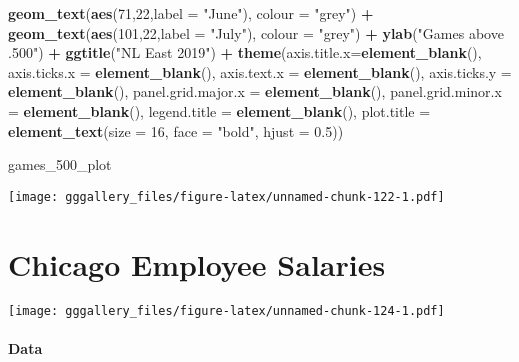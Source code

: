 \documentclass[]{book}
\newenvironment{Shaded}{\begin{snugshade}}{\end{snugshade}}
\newcommand{\DataTypeTok}[1]{\textcolor[rgb]{0.13,0.29,0.53}{#1}}
\newcommand{\DecValTok}[1]{\textcolor[rgb]{0.00,0.00,0.81}{#1}}
\newcommand{\FloatTok}[1]{\textcolor[rgb]{0.00,0.00,0.81}{#1}}
\newcommand{\KeywordTok}[1]{\textcolor[rgb]{0.13,0.29,0.53}{\textbf{#1}}}
\newcommand{\NormalTok}[1]{#1}
\newcommand{\OperatorTok}[1]{\textcolor[rgb]{0.81,0.36,0.00}{\textbf{#1}}}
\newcommand{\StringTok}[1]{\textcolor[rgb]{0.31,0.60,0.02}{#1}}
\begin{document}
\begin{Shaded}
\begin{Highlighting}[]
\StringTok{  }\KeywordTok{geom_text}\NormalTok{(}\KeywordTok{aes}\NormalTok{(}\DecValTok{71}\NormalTok{,}\DecValTok{22}\NormalTok{,}\DataTypeTok{label =} \StringTok{"June"}\NormalTok{), }\DataTypeTok{colour =} \StringTok{"grey"}\NormalTok{) }\OperatorTok{+}
\StringTok{  }\KeywordTok{geom_text}\NormalTok{(}\KeywordTok{aes}\NormalTok{(}\DecValTok{101}\NormalTok{,}\DecValTok{22}\NormalTok{,}\DataTypeTok{label =} \StringTok{"July"}\NormalTok{), }\DataTypeTok{colour =} \StringTok{"grey"}\NormalTok{) }\OperatorTok{+}
\StringTok{  }\KeywordTok{ylab}\NormalTok{(}\StringTok{"Games above .500"}\NormalTok{) }\OperatorTok{+}
\StringTok{  }\KeywordTok{ggtitle}\NormalTok{(}\StringTok{"NL East 2019"}\NormalTok{) }\OperatorTok{+}
\StringTok{  }\KeywordTok{theme}\NormalTok{(}\DataTypeTok{axis.title.x=}\KeywordTok{element_blank}\NormalTok{(),}
        \DataTypeTok{axis.ticks.x =} \KeywordTok{element_blank}\NormalTok{(),}
        \DataTypeTok{axis.text.x =} \KeywordTok{element_blank}\NormalTok{(),}
        \DataTypeTok{axis.ticks.y =} \KeywordTok{element_blank}\NormalTok{(),}
        \DataTypeTok{panel.grid.major.x =} \KeywordTok{element_blank}\NormalTok{(),}
        \DataTypeTok{panel.grid.minor.x =} \KeywordTok{element_blank}\NormalTok{(),}
        \DataTypeTok{legend.title =} \KeywordTok{element_blank}\NormalTok{(),}
        \DataTypeTok{plot.title =} \KeywordTok{element_text}\NormalTok{(}\DataTypeTok{size =} \DecValTok{16}\NormalTok{, }\DataTypeTok{face =} \StringTok{"bold"}\NormalTok{, }\DataTypeTok{hjust =} \FloatTok{0.5}\NormalTok{))}


\NormalTok{games_}\DecValTok{500}\NormalTok{_plot}
\end{Highlighting}
\end{Shaded}

\texttt{[image: gggallery\_files/figure-latex/unnamed-chunk-122-1.pdf]}

\hypertarget{chihist}{%
\chapter*{Chicago Employee Salaries}\label{chihist}}

\texttt{[image: gggallery\_files/figure-latex/unnamed-chunk-124-1.pdf]}

\hypertarget{chihistdata}{%
\subsubsection*{Data}\label{chihistdata}}
\end{document}
